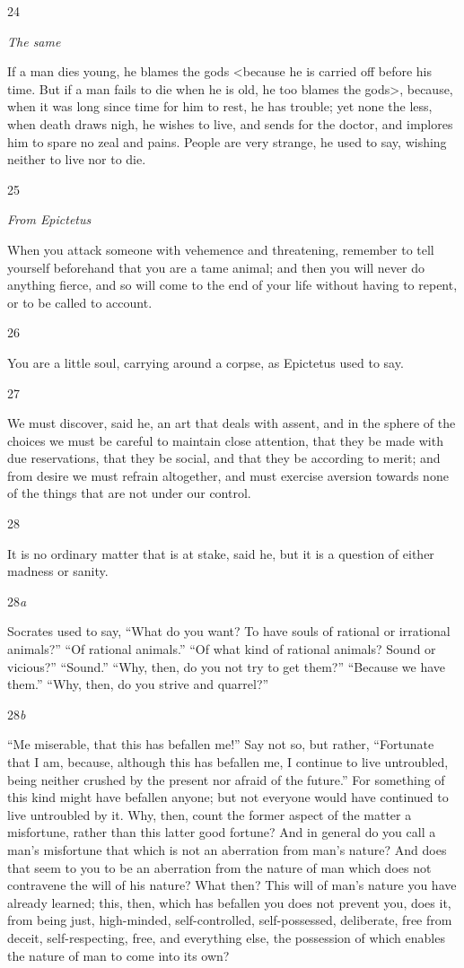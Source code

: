 24

\emph{The same}

If a man dies young, he blames the gods <because he is carried off before his time. But if a man fails to die when he is old, he too blames the gods>, because, when it was long since time for him to rest, he has trouble; yet none the less, when death draws nigh, he wishes to live, and sends for the doctor, and implores him to spare no zeal and pains. People are very strange, he used to say, wishing neither to live nor to die.

25

\emph{From Epictetus}

When you attack someone with vehemence and threatening, remember to tell yourself beforehand that you are a tame animal; and then you will never do anything fierce, and so will come to the end of your life without having to repent, or to be called to account.

26

You are a little soul, carrying around a corpse, as Epictetus used to say.

27

We must discover, said he, an art that deals with assent, and in the sphere of the choices we must be careful to maintain close attention, that they be made with due reservations, that they be social, and that they be according to merit; and from desire we must refrain altogether, and must exercise aversion towards none of the things that are not under our control.

28

It is no ordinary matter that is at stake, said he, but it is a question of either madness or sanity.

28\emph{a}

Socrates used to say, ``What do you want? To have souls of rational or irrational animals?'' ``Of rational animals.'' ``Of what kind of rational animals? Sound or vicious?'' ``Sound.'' ``Why, then, do you not try to get them?'' ``Because we have them.'' ``Why, then, do you strive and quarrel?''

28\emph{b}

``Me miserable, that this has befallen me!'' Say not so, but rather, ``Fortunate that I am, because, although this has befallen me, I continue to live untroubled, being neither crushed by the present nor afraid of the future.'' For something of this kind might have befallen anyone; but not everyone would have continued to live untroubled by it. Why, then, count the former aspect of the matter a misfortune, rather than this latter good fortune? And in general do you call a man's misfortune that which is not an aberration from man's nature? And does that seem to you to be an aberration from the nature of man which does not contravene the will of his nature? What then? This will of man's nature you have already learned; this, then, which has befallen you does not prevent you, does it, from being just, high-minded, self-controlled, self-possessed, deliberate, free from deceit, self-respecting, free, and everything else, the possession of which enables the nature of man to come into its own?

